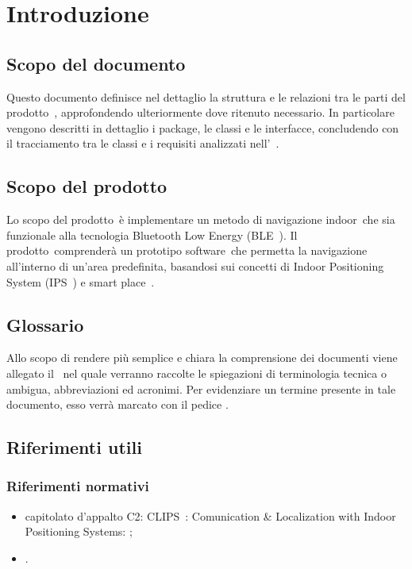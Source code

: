\documentclass[../DefinizioneDiProdotto.tex]{subfiles}
\begin{document}
\section{Introduzione}
	\subsection{Scopo del documento}
		Questo documento definisce nel dettaglio la struttura e le relazioni tra le parti del prodotto\g\ , approfondendo ulteriormente dove ritenuto necessario. In particolare vengono descritti in dettaglio i package, le classi e le interfacce, concludendo con il tracciamento tra le classi e i requisiti analizzati nell'\analisideirequisitiv\ .
	
	\subsection{Scopo del prodotto}
		Lo scopo del prodotto\g\ è implementare un metodo di navigazione indoor\g\ che sia funzionale alla tecnologia Bluetooth Low Energy (BLE\g\ ). Il prodotto\g\ comprenderà un prototipo software\g\ che permetta la navigazione all'interno di un'area predefinita, basandosi sui concetti di Indoor Positioning System (IPS\g\ ) e smart place\g\ .
	
	\subsection{Glossario} \label{sec:Glossario}
	Allo scopo di rendere più semplice e chiara la comprensione dei documenti viene allegato il \glossariov\ nel quale verranno raccolte le spiegazioni di  terminologia tecnica o  ambigua, abbreviazioni ed acronimi. Per evidenziare un termine presente in tale documento, esso verrà marcato con il pedice \g .
	
	\subsection{Riferimenti utili}
	
		\subsubsection{Riferimenti normativi}
		\begin{itemize}
			\item capitolato d'appalto C2: CLIPS\g\ : Comunication \& Localization with Indoor Positioning Systems:
			;
			\item \normediprogettov.
		\end{itemize}
		
\end{document}
